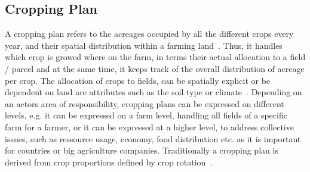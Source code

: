 \documentclass{Academic}
\begin{document}
    \subsection{Cropping Plan}
    A cropping plan refers to the acreages occupied by all the different crops every year, and their spatial distribution within a farming land~\cite{dury_models_2012}. Thus, it handles which crop is growed where on the farm, in terms their actual allocation to a field / parcel and at the same time, it keeps track of the overall distribution of acreage per crop. The allocation of crops to fields, can be spatially explicit or be dependent on land are attributes such as the soil type or climate~\cite{dury_models_2012}. Depending on an actors area of responsibility, cropping plans can be expressed on different levels, e.g. it can be expressed on a farm level, handling all fields of a specific farm for a farmer, or it can be expressed at a higher level, to address collective issues, such as ressource usage, economy, food distribution etc. as it is important for countries or big agriculture companies. Traditionally a cropping plan is derived from crop proportions defined by crop rotation~\cite{dury_models_2012}.
\end{document}
